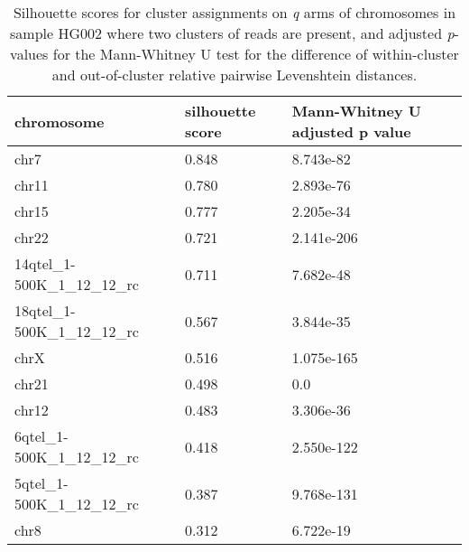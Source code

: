 \begin{samepage} \begin{table}[h!] \begin{tabular}{lll}
\hline
\textbf{chromosome}             &  \textbf{silhouette score}  &  \textbf{Mann-Whitney U adjusted p value}  \\  \hline
chr7                            &  0.848                      &  8.743e-82                                 \\
chr11                           &  0.780                      &  2.893e-76                                 \\
chr15                           &  0.777                      &  2.205e-34                                 \\
chr22                           &  0.721                      &  2.141e-206                                \\
14qtel\_1-500K\_1\_12\_12\_rc   &  0.711                      &  7.682e-48                                 \\
18qtel\_1-500K\_1\_12\_12\_rc   &  0.567                      &  3.844e-35                                 \\
chrX                            &  0.516                      &  1.075e-165                                \\
chr21                           &  0.498                      &  0.0                                       \\
chr12                           &  0.483                      &  3.306e-36                                 \\
6qtel\_1-500K\_1\_12\_12\_rc    &  0.418                      &  2.550e-122                                \\
5qtel\_1-500K\_1\_12\_12\_rc    &  0.387                      &  9.768e-131                                \\
chr8                            &  0.312                      &  6.722e-19                                 \\
\hline
\end{tabular}
\caption{Silhouette scores for cluster assignments on \textit{q} arms of chromosomes in sample HG002 where two clusters of reads are present, and adjusted \textit{p}-values for the Mann-Whitney U test for the difference of within-cluster and out-of-cluster relative pairwise Levenshtein distances.}
\label{tab:levenshtein-q_arm}
\end{table}
\end{samepage}
